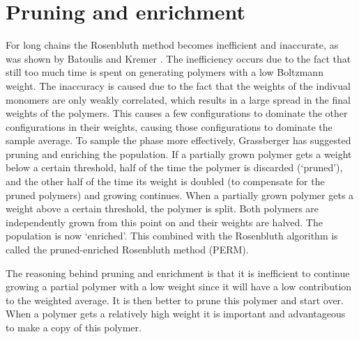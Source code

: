 \section{Pruning and enrichment}
For long chains the Rosenbluth method becomes inefficient and inaccurate, as was shown by Batoulis and Kremer \cite{batoulis1988statistical}. The inefficiency occurs due to the fact that still too much time is spent on generating polymers with a low Boltzmann weight. The inaccuracy is caused due to the fact that the weights of the indivual monomers are only weakly correlated, which results in a large spread in the final weights of the polymers. This causes a few configurations to dominate the other configurations in their weights, causing those configurations to dominate the sample average. To sample the phase more effectively, Grassberger has suggested pruning and enriching the population. If a partially grown polymer gets a weight below a certain threshold, half of the time the polymer is discarded (`pruned'), and the other half of the time its weight is doubled (to compensate for the pruned polymers) and growing continues. When a partially grown polymer gets a weight above a certain threshold, the polymer is split. Both polymers are independently grown from this point on and their weights are halved. The population is now `enriched'. This combined with the Rosenbluth algorithm is called the pruned-enriched Rosenbluth method (PERM).

The reasoning behind pruning and enrichment is that it is inefficient to continue growing a partial polymer with a low weight since it will have a low contribution to the weighted average. It is then better to prune this polymer and start over. When a polymer gets a relatively high weight it is important and advantageous to make a copy of this polymer.

\begin{Figure}
    \vspace{18 mm}
    \centering
    \def\svgwidth{\linewidth}
    
    \vspace{18 mm}
    \label{fig:my_label}
\end{Figure}

